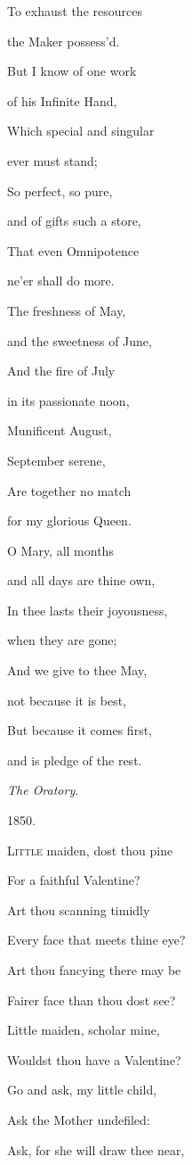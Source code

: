 To exhaust the resources

the Maker possess'd.

But I know of one work

of his Infinite Hand,

Which special and singular

ever must stand;

So perfect, so pure,

and of gifts such a store,

That even Omnipotence

ne'er shall do more. 

The freshness of May,

and the sweetness of June,

And the fire of July

in its passionate noon,

Munificent August,

September serene,

Are together no match

for my glorious Queen.

O Mary, all months

and all days are thine own,

In thee lasts their joyousness,

when they are gone;

And we give to thee May,

not because it is best,

But because it comes first,

and is pledge of the rest.

\emph{The Oratory}.

1850.


L\textsc{ittle} maiden, dost thou pine

For a faithful Valentine?

Art thou scanning timidly

Every face that meets thine eye?

Art thou fancying there may be

Fairer face than thou dost see?

Little maiden, scholar mine,

Wouldst thou have a Valentine?

Go and ask, my little child,

Ask the Mother undefiled:

Ask, for she will draw thee near,

